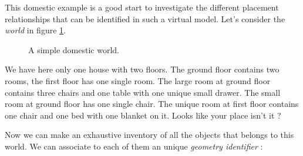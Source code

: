 \pn This domestic example is a good start to investigate the different
placement  relationships that can  be identified  in such  a virtual
model.  Let's consider the \emph{world} in figure \ref{fig:house:2}.
\begin{figure}[h]
\begin{center}
\scalebox{1.}{}
\end{center}
\caption{A simple domestic world.}\label{fig:house:2}
\end{figure}
\pn We  have here  only one  house with two  floors. The  ground floor
contains two  rooms, the first floor  has one single  room. The large
room  at ground floor  contains three  chairs and  one table  with one
unique small  drawer.  The small room  at ground floor  has one single
chair.  The unique room at first floor contains one chair and one bed
with one blanket on it. Looks like your place isn't it ?

\pn Now we can make an exhaustive inventory of all the objects
that belongs to this world. We can associate to each of them an unique
\emph{geometry identifier} :

